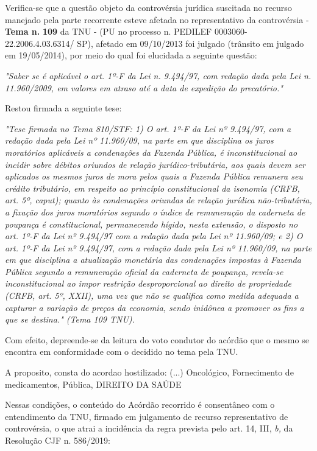 \documentclass[12pt]{article}
\begin{document}
\justifying
\noindent Verifica-se que a questão objeto da controvérsia jurídica suscitada no recurso manejado pela parte recorrente esteve afetada no representativo da controvérsia - \textbf{Tema n. }\textbf{109} da TNU - (PU no processo n. PEDILEF 0003060-22.2006.4.03.6314/ SP),  afetado em 09/10/2013 foi julgado (trânsito em julgado em 19/05/2014), por meio do qual foi elucidada a seguinte questão:

\noindent \textit{"Saber se é aplicável o art. 1º-F da Lei n. 9.494/97, com redação dada pela Lei n. 11.960/2009, em valores em atraso até a data de expedição do precatório."}

\noindent Restou firmada a seguinte tese:

\noindent \textit{"Tese firmada no Tema 810/STF: 1) O art. 1º-F da Lei nº 9.494/97, com a redação dada pela Lei nº 11.960/09, na parte em que disciplina os juros moratórios aplicáveis a condenações da Fazenda Pública, é inconstitucional ao incidir sobre débitos oriundos de relação jurídico-tributária, aos quais devem ser aplicados os mesmos juros de mora pelos quais a Fazenda Pública remunera seu crédito tributário, em respeito ao princípio constitucional da isonomia (CRFB, art. 5º, caput); quanto às condenações oriundas de relação jurídica não-tributária, a fixação dos juros moratórios segundo o índice de remuneração da caderneta de poupança é constitucional, permanecendo hígido, nesta extensão, o disposto no art. 1º-F da Lei nº 9.494/97 com a redação dada pela Lei nº 11.960/09; e 2) O art. 1º-F da Lei nº 9.494/97, com a redação dada pela Lei nº 11.960/09, na parte em que disciplina a atualização monetária das condenações impostas à Fazenda Pública segundo a remuneração oficial da caderneta de poupança, revela-se inconstitucional ao impor restrição desproporcional ao direito de propriedade (CRFB, art. 5º, XXII), uma vez que não se qualifica como medida adequada a capturar a variação de preços da economia, sendo inidônea a promover os fins a que se destina." (Tema 109 TNU).}

\noindent Com efeito, depreende-se da leitura do voto condutor do acórdão que o mesmo se encontra em conformidade com o decidido no  tema pela TNU.

\noindent A proposito, consta do acordao hostilizado: (...) Oncológico, Fornecimento de medicamentos, Pública, DIREITO DA SAÚDE

\noindent Nessas condições, o conteúdo do Acórdão recorrido é consentâneo com o entendimento da TNU, firmado em julgamento de recurso representativo de controvérsia, o que atrai a incidência da regra prevista pelo art. 14, III, \textit{b,} da Resolução CJF n. 586/2019:
\end{document}
